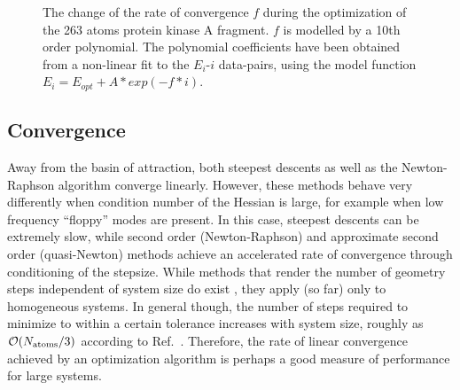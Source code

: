 \documentclass[prl,aps,preprint,showpacs,superbib]{revtex4}
\begin{document}
{\begin{figure}[h]
\caption{
The change of the rate of convergence $f$ during the optimization
of the 263 atoms protein kinase A fragment. $f$ is modelled
by a 10th order polynomial. The polynomial coefficients
have been obtained from a non-linear fit to the $E_{i}$-$i$
data-pairs, using the model function $E_{i}=E_{opt}+A*exp(-f*i)$.}
\label{convfact} 
\end{figure}
}

\subsection{Convergence}

Away from the basin of attraction, both steepest descents as well as the 
Newton-Raphson algorithm converge linearly.   However, these methods behave very differently
when condition number of the Hessian is large, for example when low frequency ``floppy'' modes
are present.  In this case, steepest descents can be extremely slow, while second order 
(Newton-Raphson) and approximate second order (quasi-Newton) methods achieve an accelerated rate 
of convergence through conditioning of the stepsize.   While methods that render  the
number of geometry steps independent of system size do exist \cite{SGoedecker01}, they apply (so far) 
only to homogeneous systems.  In general though, the number of steps required to minimize to within
a certain tolerance increases with system size, roughly as ${\cal O}(N_{\rm atoms}/3)$ 
according to Ref.~.  Therefore, the rate of linear convergence achieved by an 
optimization algorithm is perhaps a good  measure of performance for large systems.  
\end{document}
